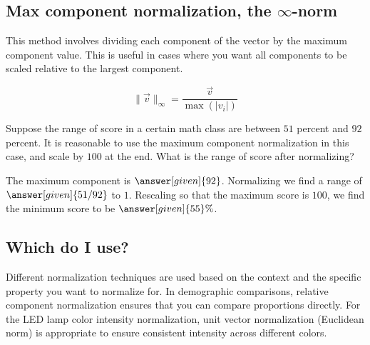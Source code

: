 \documentclass{ximera}
\begin{document}
\subsection{Max component normalization, the $\infty$-norm}

This method involves dividing each component of the vector by the maximum component value. This is useful in cases where you want all components to be scaled relative to the largest component.

\[ \|\vec{v}\|_\infty = \frac{\vec{v}}{\max(|v_i|)} \]

\begin{example}
Suppose the range of score in a certain math class are between $51$
percent and $92$ percent. It is reasonable to use the maximum component
normalization in this case, and scale by $100$ at the end. What is the
range of score after normalizing?
\begin{explanation}
The maximum component is $\answer[given]{92}$. Normalizing we find a
range of $\answer[given]{51/92}$ to $1$. Rescaling so that the maximum
score is $100$, we find the minimum score to be $\answer[given]{55}\%$.
\end{explanation}
\end{example}



\subsection{Which do I use?}
Different normalization techniques are used based on the context and
the specific property you want to normalize for. In demographic
comparisons, relative component normalization ensures that you can
compare proportions directly. For the LED lamp color intensity
normalization, unit vector normalization (Euclidean norm) is
appropriate to ensure consistent intensity across different colors.



\end{document}

